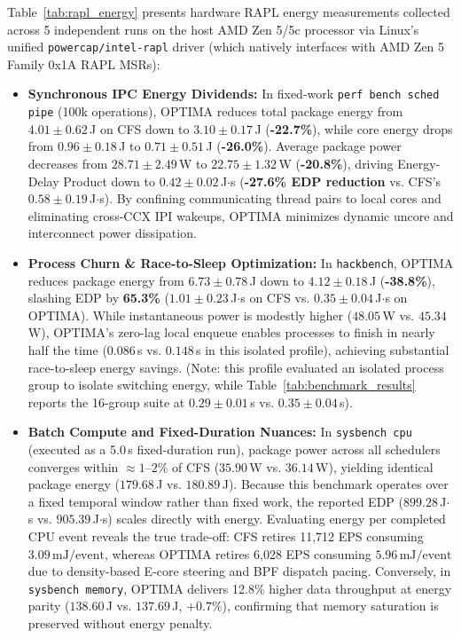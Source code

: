 \documentclass[conference]{IEEEtran}
\begin{document}
Table~\ref{tab:rapl_energy} presents hardware RAPL energy measurements collected across 5 independent runs on the host AMD Zen 5/5c processor via Linux's unified \texttt{powercap/intel-rapl} driver (which natively interfaces with AMD Zen 5 Family 0x1A RAPL MSRs):
\begin{itemize}\setlength{\itemsep}{0pt}\setlength{\parskip}{0pt}
    \item \textbf{Synchronous IPC Energy Dividends:} In fixed-work \texttt{perf bench sched pipe} (100k operations), OPTIMA reduces total package energy from $4.01 \pm 0.62$\,J on CFS down to $\mathbf{3.10 \pm 0.17}$\,J (\textbf{-22.7\%}), while core energy drops from $0.96 \pm 0.18$\,J to $\mathbf{0.71 \pm 0.51}$\,J (\textbf{-26.0\%}). Average package power decreases from $28.71 \pm 2.49$\,W to $\mathbf{22.75 \pm 1.32}$\,W (\textbf{-20.8\%}), driving Energy-Delay Product down to $\mathbf{0.42 \pm 0.02}$\,J$\cdot$s (\textbf{-27.6\% EDP reduction} vs. CFS's $0.58 \pm 0.19$\,J$\cdot$s). By confining communicating thread pairs to local cores and eliminating cross-CCX IPI wakeups, OPTIMA minimizes dynamic uncore and interconnect power dissipation.
    \item \textbf{Process Churn \& Race-to-Sleep Optimization:} In \texttt{hackbench}, OPTIMA reduces package energy from $6.73 \pm 0.78$\,J down to $\mathbf{4.12 \pm 0.18}$\,J (\textbf{-38.8\%}), slashing EDP by \textbf{65.3\%} ($1.01 \pm 0.23$\,J$\cdot$s on CFS vs. $\mathbf{0.35 \pm 0.04}$\,J$\cdot$s on OPTIMA). While instantaneous power is modestly higher ($48.05$\,W vs. $45.34$\,W), OPTIMA's zero-lag local enqueue enables processes to finish in nearly half the time ($0.086$\,s vs. $0.148$\,s in this isolated profile), achieving substantial race-to-sleep energy savings. (Note: this profile evaluated an isolated process group to isolate switching energy, while Table~\ref{tab:benchmark_results} reports the 16-group suite at $0.29 \pm 0.01$\,s vs. $0.35 \pm 0.04$\,s).
    \item \textbf{Batch Compute and Fixed-Duration Nuances:} In \texttt{sysbench cpu} (executed as a 5.0\,s fixed-duration run), package power across all schedulers converges within $\approx 1\text{--}2\%$ of CFS ($35.90$\,W vs. $36.14$\,W), yielding identical package energy ($179.68$\,J vs. $180.89$\,J). Because this benchmark operates over a fixed temporal window rather than fixed work, the reported EDP ($899.28$\,J$\cdot$s vs. $905.39$\,J$\cdot$s) scales directly with energy. Evaluating energy per completed CPU event reveals the true trade-off: CFS retires 11,712 EPS consuming $3.09\,\text{mJ/event}$, whereas OPTIMA retires 6,028 EPS consuming $5.96\,\text{mJ/event}$ due to density-based E-core steering and BPF dispatch pacing. Conversely, in \texttt{sysbench memory}, OPTIMA delivers 12.8\% higher data throughput at energy parity ($138.60$\,J vs. $137.69$\,J, $+0.7\%$), confirming that memory saturation is preserved without energy penalty.
\end{itemize}
\end{document}
